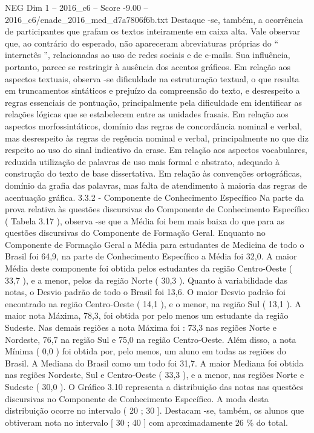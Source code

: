 \begin{textsample}{NEG Dim 1 – 2016\_c6 – Score -9.00 – 2016\_c6/enade\_2016\_med\_d7a7806f6b.txt}
Destaque -se, também, a ocorrência de participantes que grafam os textos inteiramente em caixa alta.
Vale observar que, ao contrário do esperado, não apareceram abreviaturas próprias do “ internetês ”, relacionadas ao uso de redes sociais e de e-mails.
Sua influência, portanto, parece se restringir à ausência dos acentos gráficos.
Em relação aos aspectos textuais, observa -se dificuldade na estruturação textual, o que resulta em truncamentos sintáticos e prejuízo da compreensão do texto, e desrespeito a regras essenciais de pontuação, principalmente pela dificuldade em identificar as relações lógicas que se estabelecem entre as unidades frasais.
Em relação aos aspectos morfossintáticos, domínio das regras de concordância nominal e verbal, mas desrespeito às regras de regência nominal e verbal, principalmente no que diz respeito ao uso do sinal indicativo da crase.
Em relação aos aspectos vocabulares, reduzida utilização de palavras de uso mais formal e abstrato, adequado à construção do texto de base dissertativa.
Em relação às convenções ortográficas, domínio da grafia das palavras, mas falta de atendimento à maioria das regras de acentuação gráfica. 3.3.2 - Componente de Conhecimento Específico Na parte da prova relativa às questões discursivas do Componente de Conhecimento Específico ( Tabela 3.17 ), observa -se que a Média foi bem mais baixa do que para as questões discursivas do Componente de Formação Geral.
Enquanto no Componente de Formação Geral a Média para estudantes de Medicina de todo o Brasil foi 64,9, na parte de Conhecimento Específico a Média foi 32,0.
A maior Média deste componente foi obtida pelos estudantes da região Centro-Oeste ( 33,7 ), e a menor, pelos da região Norte ( 30,3 ).
Quanto à variabilidade das notas, o Desvio padrão de todo o Brasil foi 13,6.
O maior Desvio padrão foi encontrado na região Centro-Oeste ( 14,1 ), e o menor, na região Sul ( 13,1 ).
A maior nota Máxima, 78,3, foi obtida por pelo menos um estudante da região Sudeste.
Nas demais regiões a nota Máxima foi : 73,3 nas regiões Norte e Nordeste, 76,7 na região Sul e 75,0 na região Centro-Oeste.
Além disso, a nota Mínima ( 0,0 ) foi obtida por, pelo menos, um aluno em todas as regiões do Brasil.
A Mediana do Brasil como um todo foi 31,7.
A maior Mediana foi obtida nas regiões Nordeste, Sul e Centro-Oeste ( 33,3 ), e a menor, nas regiões Norte e Sudeste ( 30,0 ).
O Gráfico 3.10 representa a distribuição das notas nas questões discursivas no Componente de Conhecimento Específico.
A moda desta distribuição ocorre no intervalo ( 20 ; 30 ].
Destacam -se, também, os alunos que obtiveram nota no intervalo [ 30 ; 40 ] com aproximadamente 26 \% do total.

\end{textsample}
